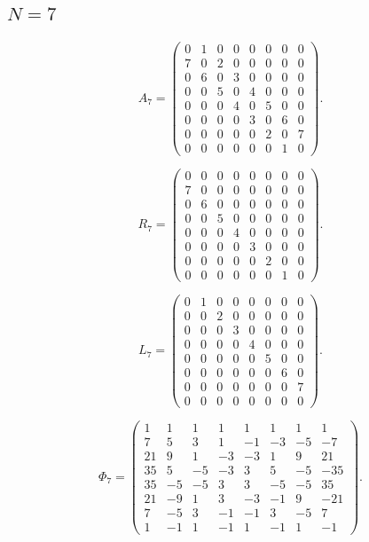 \subsection{$N=7$}
\label{tab:matrices-N07}
\begingroup
\small
\setlength{\arraycolsep}{3pt}
\[
A_{7}=\begin{pmatrix}
0 & 1 & 0 & 0 & 0 & 0 & 0 & 0 \\
7 & 0 & 2 & 0 & 0 & 0 & 0 & 0 \\
0 & 6 & 0 & 3 & 0 & 0 & 0 & 0 \\
0 & 0 & 5 & 0 & 4 & 0 & 0 & 0 \\
0 & 0 & 0 & 4 & 0 & 5 & 0 & 0 \\
0 & 0 & 0 & 0 & 3 & 0 & 6 & 0 \\
0 & 0 & 0 & 0 & 0 & 2 & 0 & 7 \\
0 & 0 & 0 & 0 & 0 & 0 & 1 & 0
\end{pmatrix}.
\]
\endgroup

\begingroup
\small
\setlength{\arraycolsep}{3pt}
\[
R_{7}=\begin{pmatrix}
0 & 0 & 0 & 0 & 0 & 0 & 0 & 0 \\
7 & 0 & 0 & 0 & 0 & 0 & 0 & 0 \\
0 & 6 & 0 & 0 & 0 & 0 & 0 & 0 \\
0 & 0 & 5 & 0 & 0 & 0 & 0 & 0 \\
0 & 0 & 0 & 4 & 0 & 0 & 0 & 0 \\
0 & 0 & 0 & 0 & 3 & 0 & 0 & 0 \\
0 & 0 & 0 & 0 & 0 & 2 & 0 & 0 \\
0 & 0 & 0 & 0 & 0 & 0 & 1 & 0
\end{pmatrix}.
\]
\endgroup

\begingroup
\small
\setlength{\arraycolsep}{3pt}
\[
L_{7}=\begin{pmatrix}
0 & 1 & 0 & 0 & 0 & 0 & 0 & 0 \\
0 & 0 & 2 & 0 & 0 & 0 & 0 & 0 \\
0 & 0 & 0 & 3 & 0 & 0 & 0 & 0 \\
0 & 0 & 0 & 0 & 4 & 0 & 0 & 0 \\
0 & 0 & 0 & 0 & 0 & 5 & 0 & 0 \\
0 & 0 & 0 & 0 & 0 & 0 & 6 & 0 \\
0 & 0 & 0 & 0 & 0 & 0 & 0 & 7 \\
0 & 0 & 0 & 0 & 0 & 0 & 0 & 0
\end{pmatrix}.
\]
\endgroup

\begingroup
\small
\setlength{\arraycolsep}{3pt}
\[
\Phi_{7}=\begin{pmatrix}
1 & 1 & 1 & 1 & 1 & 1 & 1 & 1 \\
7 & 5 & 3 & 1 & -1 & -3 & -5 & -7 \\
21 & 9 & 1 & -3 & -3 & 1 & 9 & 21 \\
35 & 5 & -5 & -3 & 3 & 5 & -5 & -35 \\
35 & -5 & -5 & 3 & 3 & -5 & -5 & 35 \\
21 & -9 & 1 & 3 & -3 & -1 & 9 & -21 \\
7 & -5 & 3 & -1 & -1 & 3 & -5 & 7 \\
1 & -1 & 1 & -1 & 1 & -1 & 1 & -1
\end{pmatrix}.
\]
\endgroup

